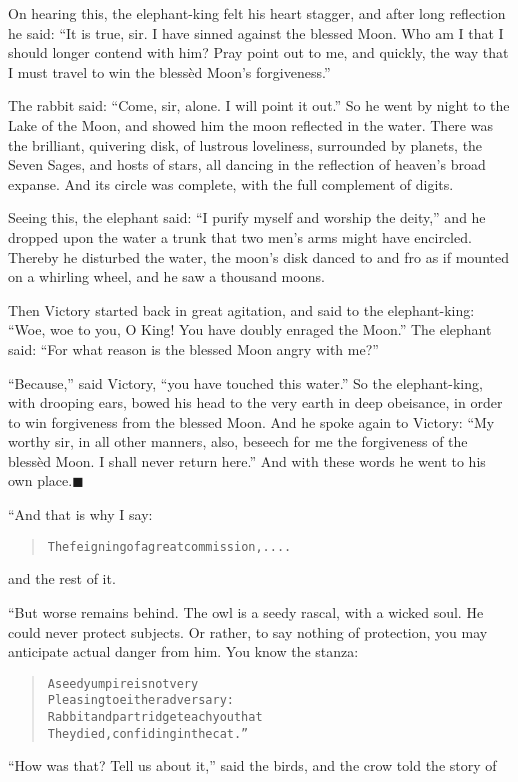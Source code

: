 \documentclass[article, twoside, 14pt]{memoir}
\newcommand{\qed}{\hfill \ensuremath{\blacksquare}}
\renewenvironment{verbatim}{%
\begin{quote}%
\vskip -10pt%
\begin{alltt}\normalfont\large}{\end{alltt}%
\end{quote}%
\vskip -10pt
} %
\begin{document}
On hearing this, the elephant-king felt his heart stagger, and
after long reflection he said:
``It is true, sir. I have sinned against the blessed Moon. Who am I that I should longer contend with him? Pray point out to me, and quickly, the way that I must travel to win the blessèd Moon's forgiveness.''

The rabbit said: ``Come, sir, alone. I will point it out.'' So he
went by night to the Lake of the Moon, and showed him the moon
reflected in the water. There was the brilliant, quivering disk, of
lustrous loveliness, surrounded by planets, the Seven Sages, and
hosts of stars, all dancing in the reflection of heaven's broad
expanse. And its circle was complete, with the full complement of
digits.

Seeing this, the elephant said:
``I purify myself and worship the deity,'' and he dropped upon the
water a trunk that two men's arms might have encircled. Thereby he
disturbed the water, the moon's disk danced to and fro as if
mounted on a whirling wheel, and he saw a thousand moons.

Then Victory started back in great agitation, and said to the
elephant-king:
``Woe, woe to you, O King! You have doubly enraged the Moon.'' The
elephant said:
``For what reason is the blessed Moon angry with me?''

``Because,'' said Victory, ``you have touched this water.'' So the
elephant-king, with drooping ears, bowed his head to the very earth
in deep obeisance, in order to win forgiveness from the blessed
Moon. And he spoke again to Victory:
``My worthy sir, in all other manners, also, beseech for me the forgiveness of the blessèd Moon. I shall never return here.''
And with these words he went to his own place.\hyperref[s49]{\qed}

“And that is why I say:

\begin{verbatim}
The feigning of a great commission,....
\end{verbatim}
and the rest of it.

“But worse remains behind. The owl is a seedy rascal, with a wicked
soul. He could never protect subjects. Or rather, to say nothing of
protection, you may anticipate actual danger from him. You know the
stanza:

\begin{verbatim}
A seedy umpire is not very
Pleasing to either adversary:
Rabbit and partridge teach you that{\textemdash}
They died, confiding in the cat.”
\end{verbatim}
``How was that? Tell us about it,'' said the birds, and the crow
told the story of
\end{document}

